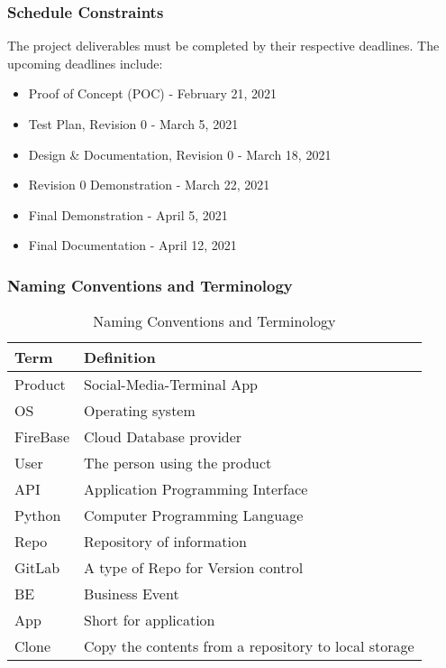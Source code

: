 \documentclass[12pt, titlepage]{article}
\begin{document}
\subsubsection{Schedule Constraints}
The project deliverables must be completed by their respective deadlines. The upcoming deadlines include:
\begin{itemize}
    \item Proof of Concept (POC) - February 21, 2021
    \item Test Plan, Revision 0 - March 5, 2021
    \item Design \& Documentation, Revision 0 - March 18, 2021
    \item Revision 0 Demonstration - March 22, 2021
    \item Final Demonstration - April 5, 2021
    \item Final Documentation - April 12, 2021
\end{itemize}

\newpage
\subsubsection{Naming Conventions and Terminology}
\begin{table}[h]
    \caption{Naming Conventions and Terminology}
    \centering
    \begin{tabular}{ |p{5cm}|p{10.5cm}|  }
     \hline
     \textbf{Term} & \textbf{Definition} \\
     \hline
     Product & Social-Media-Terminal App \\
     \hline
     OS & Operating system\\
     \hline
     FireBase & Cloud Database provider\\
     \hline
     User & The person using the product\\
     \hline
     API & Application Programming Interface\\
     \hline
     Python & Computer Programming Language\\
     \hline
     Repo & Repository of information\\
     \hline
     GitLab & A type of Repo for Version control\\
     \hline
     BE & Business Event\\
    \hline
     App & Short for application\\
    \hline
     Clone & Copy the contents from a repository to local storage\\
     \hline
    \end{tabular}
\end{table}
\end{document}
